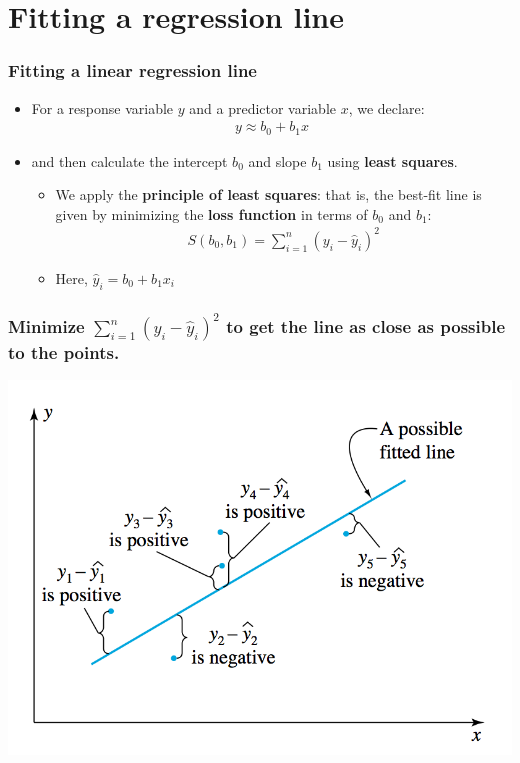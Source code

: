 \documentclass[handout]{beamer}
\providecommand{\wh}[1]{\widehat{#1}}
\numberwithin{equation}{section}
\begin{document}
\section{Fitting a regression line}

\begin{frame}
\frametitle{Fitting a linear regression line}
\begin{itemize}
\pause \item For a response variable $y$ and a predictor variable $x$, we declare:
\pause \begin{align*}
y \approx b_0 + b_1 x
\end{align*}
\pause \item and then calculate the intercept $b_0$ and slope $b_1$ using {\bf least squares}.
\begin{itemize}
\pause \item We apply the {\bf principle of least squares}: that is, the best-fit line is given by minimizing the {\bf loss function} in terms of $b_0$ and $b_1$:
\pause \begin{align*}
S(b_0, b_1) = \sum_{i = 1}^n (y_i - \wh{y}_i)^2
\end{align*}
\pause \item Here, $\wh{y}_i  = b_0 + b_1 x_i$
\end{itemize}
\end{itemize}
\end{frame}


\begin{frame}
\frametitle{\small Minimize $\sum_{i = 1}^n (y_i - \wh{y}_i)^2$ to get the line as close as possible to the points.}
 \includegraphics{../../fig/lossfunplot.png}
\end{frame}
\end{document}
